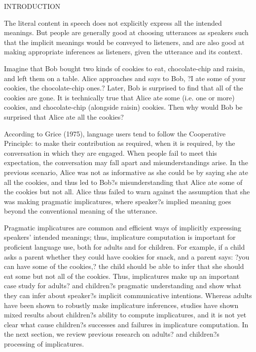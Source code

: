 INTRODUCTION

The literal content in speech does not explicitly express all the intended meanings. But people are generally good at choosing utterances as speakers such that the implicit meanings would be conveyed to listeners, and are also good at making appropriate inferences as listeners, given the utterance and its context. 

Imagine that Bob bought two kinds of cookies to eat, chocolate-chip and raisin, and left them on a table. Alice approaches and says to Bob, ?I ate some of your cookies, the chocolate-chip ones.? Later, Bob is surprised to find that all of the cookies are gone. It is technically true that Alice ate some (i.e. one or more) cookies, and chocolate-chip (alongside raisin) cookies. Then why would Bob be surprised that Alice ate all the cookies?

According to Grice (1975), language users tend to follow the Cooperative Principle: to make their contribution as required, when it is required, by the conversation in which they are engaged. When people fail to meet this expectation, the conversation may fall apart and misunderstandings arise. In the previous scenario, Alice was not as informative as she could be by saying she ate all the cookies, and thus led to Bob?s misunderstanding that Alice ate some of the cookies but not all. Alice thus failed to warn against the assumption that she was making pragmatic implicatures, where speaker?s implied meaning goes beyond the conventional meaning of the utterance.

Pragmatic implicatures are common and efficient ways of implicitly expressing speakers' intended meanings; thus, implicature computation is important for proficient language use, both for adults and for children. For example, if a child asks a parent whether they could have cookies for snack, and a parent says: ?you can have some of the cookies,? the child should be able to infer that she should eat some but not all of the cookies. Thus, implicatures make up an important case study for adults? and children?s pragmatic understanding and show what they can infer about speaker?s implicit communicative intentions. Whereas adults have been shown to robustly make implicature inferences, studies have shown mixed results about children?s ability to compute implicatures, and it is not yet clear what cause children?s successes and failures in implicature computation. In the next section, we review previous research on adults? and children?s processing of implicatures.


